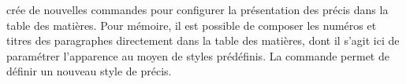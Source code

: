 \begin{noprint}
\renewcommand*{\cftsubsectionaftersnum}{.}
\renewcommand*{\cftsubsectionaftersnumb}{\mdseries\defaultcolour}
\renewcommand*{\cftsubsectionfont}{\footnotesize\if@modern\sffamily\if@colourall\maincolour\fi\fi\bfseries}
\setlength{\cftbeforesubsectionskip}{\z@}
\end{noprint}

\begin{noprint}
\renewcommand*{\cftsubsubsectionaftersnum}{.}
\renewcommand*{\cftsubsubsectionaftersnumb}{\mdseries\defaultcolour}
\renewcommand*{\cftsubsubsectionfont}{\footnotesize\if@modern\sffamily\if@colourall\maincolour\fi\fi\bfseries}
\setlength{\cftbeforesubsubsectionskip}{\z@}
\end{noprint}

\begin{noprint}
\renewcommand*{\cftparagraphaftersnum}{.}
\renewcommand*{\cftparagraphaftersnumb}{\mdseries\defaultcolour}
\renewcommand*{\cftparagraphfont}{\footnotesize\if@modern\sffamily\if@colourall\maincolour\fi\fi\bfseries}
\setlength{\cftbeforeparagraphskip}{\z@}
\end{noprint}

\begin{noprint}
\renewcommand*{\cftsubparagraphaftersnum}{.}
\renewcommand*{\cftsubparagraphaftersnumb}{\mdseries\defaultcolour}
\renewcommand*{\cftsubparagraphfont}{\footnotesize\if@modern\sffamily\if@colourall\maincolour\fi\fi\bfseries}
\setlength{\cftbeforesubparagraphskip}{\z@}
\end{noprint}

\frenchlaw crée de nouvelles commandes pour configurer la présentation des précis dans la table des matières. Pour mémoire, il est possible de composer les numéros et titres des paragraphes directement dans la table des matières, dont il s'agit ici de paramétrer l'apparence au moyen de styles prédéfinis. La commande  permet de définir un nouveau style de précis.

